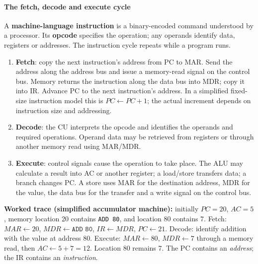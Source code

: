 \documentclass[a4paper,12pt]{article}
\begin{document}
\paragraph{The fetch, decode and execute cycle}
A \textbf{machine-language instruction} is a binary-encoded command understood by a processor. Its \textbf{opcode} specifies the operation; any operands identify data, registers or addresses. The instruction cycle repeats while a program runs.
\begin{enumerate}
    \item \textbf{Fetch}: copy the next instruction's address from PC to MAR. Send the address along the address bus and issue a memory-read signal on the control bus. Memory returns the instruction along the data bus into MDR; copy it into IR. Advance PC to the next instruction's address. In a simplified fixed-size instruction model this is $PC\gets PC+1$; the actual increment depends on instruction size and addressing.
    \item \textbf{Decode}: the CU interprets the opcode and identifies the operands and required operations. Operand data may be retrieved from registers or through another memory read using MAR/MDR.
    \item \textbf{Execute}: control signals cause the operation to take place. The ALU may calculate a result into AC or another register; a load/store transfers data; a branch changes PC. A store uses MAR for the destination address, MDR for the value, the data bus for the transfer and a write signal on the control bus.
\end{enumerate}
\textbf{Worked trace (simplified accumulator machine):} initially $PC=20$, $AC=5$, memory location 20 contains \texttt{ADD 80}, and location 80 contains 7. Fetch: $MAR\gets20$, $MDR\gets\texttt{ADD 80}$, $IR\gets MDR$, $PC\gets21$. Decode: identify addition with the value at address 80. Execute: $MAR\gets80$, $MDR\gets7$ through a memory read, then $AC\gets5+7=12$. Location 80 remains 7. The PC contains an \emph{address}; the IR contains an \emph{instruction}.
\end{document}
